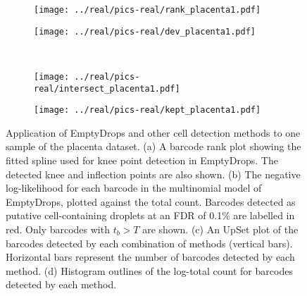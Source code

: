 \documentclass[10pt,letterpaper]{article}
\begin{document}
\begin{figure}[btp]
    \begin{center}
    \begin{subfigure}{0.49\textwidth}
        \texttt{[image: ../real/pics-real/rank\_placenta1.pdf]}
        \caption{}
    \end{subfigure}
    \begin{subfigure}{0.49\textwidth}
        \texttt{[image: ../real/pics-real/dev\_placenta1.pdf]}
        \caption{}
    \end{subfigure}\\[0.1in]
    \begin{subfigure}[b]{0.49\textwidth}
        \texttt{[image: ../real/pics-real/intersect\_placenta1.pdf]}
        \caption{}
    \end{subfigure}
    \begin{subfigure}[b]{0.49\textwidth}
        \texttt{[image: ../real/pics-real/kept\_placenta1.pdf]}
        \caption{}
    \end{subfigure}
\end{center}
    \caption{Application of EmptyDrops and other cell detection methods to one sample of the placenta dataset.
        (a) A barcode rank plot showing the fitted spline used for knee point detection in EmptyDrops. 
        The detected knee and inflection points are also shown.
        (b) The negative log-likelihood for each barcode in the multinomial model of EmptyDrops, plotted against the total count.
        Barcodes detected as putative cell-containing droplets at an FDR of 0.1\% are labelled in red.
        Only barcodes with $t_b > T$ are shown.
        (c) An UpSet plot \cite{lex2014upset} of the barcodes detected by each combination of methods (vertical bars).
        Horizontal bars represent the number of barcodes detected by each method.
        (d) Histogram outlines of the log-total count for barcodes detected by each method.
    }
\label{fig:realplacenta}
\end{figure}
\end{document}
